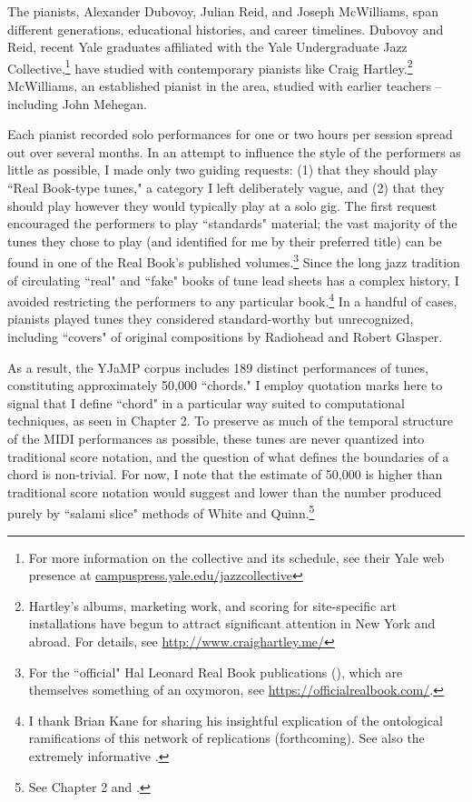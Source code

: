 The pianists, Alexander Dubovoy, Julian Reid, and Joseph McWilliams, span different generations, educational histories, and career timelines.  Dubovoy and Reid, recent Yale graduates affiliated with the Yale Undergraduate Jazz Collective,\footnote{For more information on the collective and its schedule, see their Yale web presence at \href{http://campuspress.yale.edu/jazzcollective/}{campuspress.yale.edu/jazzcollective}} have studied with contemporary pianists like Craig Hartley.\footnote{Hartley's albums, marketing work, and scoring for site-specific art installations have begun to attract significant attention in New York and abroad.  For details, see \href{http://www.craighartley.me/}{http://www.craighartley.me/}}  McWilliams, an established pianist in the area, studied with earlier teachers -- including John Mehegan.

Each pianist recorded solo performances for one or two hours per session spread out over several months.  In an attempt to influence the style of the performers as little as possible, I made only two guiding requests: (1) that they should play ``Real Book-type tunes," a category I left deliberately vague, and (2) that they should play however they would typically play at a solo gig.  The first request encouraged the performers to play ``standards" material; the vast majority of the tunes they chose to play (and identified for me by their preferred title) can be found in one of the Real Book's published volumes.\footnote{For the ``official" Hal Leonard Real Book publications (\cite{realbook}), which are themselves something of an oxymoron, see \href{https://officialrealbook.com/}{https://officialrealbook.com/}.}  Since the long jazz tradition of circulating ``real" and ``fake" books of tune lead sheets has a complex history, I avoided restricting the performers to any particular book.\footnote{I thank Brian Kane for sharing his insightful explication of the ontological ramifications of this network of replications (forthcoming).  See also the extremely informative \cite{kernfeld2006}.}  In a handful of cases, pianists played tunes they considered standard-worthy but unrecognized, including ``covers" of original compositions by Radiohead and Robert Glasper.

As a result, the YJaMP corpus includes 189 distinct performances of tunes, constituting approximately 50,000 ``chords."  I employ quotation marks here to signal that I define ``chord" in a particular way suited to computational techniques, as seen in Chapter 2.  To preserve as much of the temporal structure of the MIDI performances as possible, these tunes are never quantized into traditional score notation, and the question of what defines the boundaries of a chord is non-trivial.  For now, I note that the estimate of 50,000 is higher than traditional score notation would suggest and lower than the number produced purely by ``salami slice" methods of White and Quinn.\footnote{See Chapter 2 and \cite{wq2017}.}

